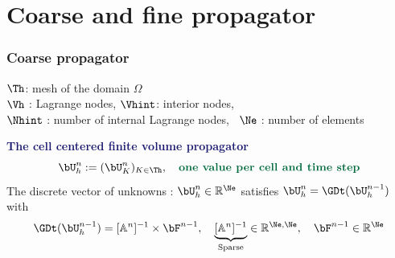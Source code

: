 \documentclass[aspectratio=169]{beamer}
\begin{document}
\section{Coarse and fine propagator}
\begin{frame}
  \frametitle{Coarse propagator}
  \vspace*{-0.1 cm}
  $\Th$: mesh of the domain $\Omega$\\
  \vspace{0.15 cm}
  $\Vh$ : Lagrange nodes, $\Vhint$: interior nodes, \\
  \vspace{0.15 cm}
  $\Nhint$ : number of internal Lagrange nodes, \ $\Ne$ : number of elements \\
  \vspace*{0.15 cm}
  \end{frame}
%
\begin{frame}
\textcolor{midnightblue}{\textbf{The cell centered finite volume propagator}}
  \begin{equation*}
\bU_h^n \egaldef (\bU_K^n)_{K\in \Th}, \quad \textcolor{cadmiumgreen}{\textbf{one value per cell and time step}} 
\end{equation*}
  The discrete vector of unknowns : $\bU_h^n \in \mathbb{R}^{\Ne}$ satisfies $\bU_h^n = \GDt(\bU_h^{n-1})$ with
  \begin{equation*}
    \GDt(\bU_h^{n-1}) = [\mathbb{A}^n]^{-1}  \times \bF^{n-1}, \quad \underbrace{[\mathbb{A}^n]^{-1}}_{\mathrm{Sparse}} \in \mathbb{R}^{\Ne,\Ne}, \quad \bF^{n-1} \in \mathbb{R}^{\Ne}
  \end{equation*}
\end{frame}
\end{document}
